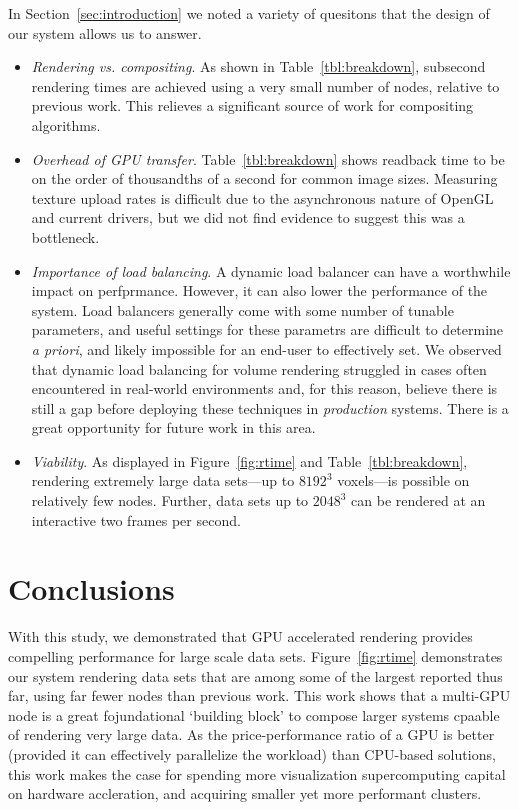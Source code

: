 In Section~\ref{sec:introduction} we noted a variety of quesitons that the
design of our system allows us to answer.

\begin{itemize}

  \item \textit{Rendering vs. compositing}.  As shown in
  Table~\ref{tbl:breakdown}, subsecond rendering times are achieved
  using a very small number of nodes, relative to previous work.  This
  relieves a significant source of work for compositing algorithms.

  \item \textit{Overhead of GPU transfer}.  Table~\ref{tbl:breakdown}
  shows readback time to be on the order of thousandths of a second for
  common image sizes.  Measuring texture upload rates is difficult due
  to the asynchronous nature of OpenGL and current drivers, but we did
  not find evidence to suggest this was a bottleneck.

  \item \textit{Importance of load balancing}.  A dynamic load balancer
  can have a worthwhile impact on perfprmance.  However, it can also
  lower the performance of the system.  Load balancers generally come
  with some number of tunable parameters, and useful settings for
  these parametrs are difficult to determine \textit{a priori}, and
  likely impossible for an end-user to effectively set.  We observed
  that dynamic load balancing for volume rendering struggled in cases
  often encountered in real-world environments and, for this reason,
  believe there is still a gap before deploying these techniques in
  \emph{production} systems.  There is a great opportunity for future
  work in this area.

  \item \textit{Viability}.  As displayed in Figure~\ref{fig:rtime} and
  Table~\ref{tbl:breakdown}, rendering extremely large data sets---up
  to $8192^3$ voxels---is possible on relatively few nodes.  Further,
  data sets up to $2048^3$ can be rendered at an interactive two frames
  per second.

\end{itemize}

\section{Conclusions}
\label{sec:par-conclusions}

With this study, we demonstrated that GPU accelerated rendering
provides compelling performance for large scale data sets.
Figure~\ref{fig:rtime} demonstrates our system rendering data sets
that are among some of the largest reported thus far, using far fewer
nodes than previous work.  This work shows that a multi-GPU node is a
great fojundational `building block' to compose larger systems cpaable
of rendering very large data.  As the price-performance ratio of a
GPU is better (provided it can effectively parallelize the workload)
than CPU-based solutions, this work makes the case for spending more
visualization supercomputing capital on hardware accleration, and
acquiring smaller yet more performant clusters.

